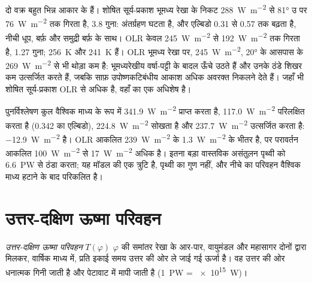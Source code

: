 दो वक्र बहुत भिन्न आकार के हैं। शोषित सूर्य-प्रकाश भूमध्य रेखा के निकट \qty{288}{W.m^{-2}} से \ang{81} उ पर \qty{76}{W.m^{-2}} तक गिरता है, \num{3.8} गुना: अंतर्ग्रहण घटता है, और एल्बिडो \num{0.31} से \num{0.57} तक बढ़ता है, नीची धूप, बर्फ़ और समुद्री बर्फ़ के साथ। OLR केवल \qty{245}{W.m^{-2}} से \qty{192}{W.m^{-2}} तक गिरता है, \num{1.27} गुना;  \qty{256}{K} और \qty{241}{K} हैं। OLR भूमध्य रेखा पर, \qty{245}{W.m^{-2}}, \ang{20} के आसपास के \qty{269}{W.m^{-2}} से भी थोड़ा कम है: भूमध्यरेखीय वर्षा-पट्टी के बादल ऊँचे उठते हैं और उनके ठंडे शिखर कम उत्सर्जित करते हैं, जबकि साफ़ उपोष्णकटिबंधीय आकाश अधिक अवरक्त निकलने देते हैं। जहाँ भी शोषित सूर्य-प्रकाश OLR से अधिक है, वहाँ  का एक अधिशेष है।

\begin{example}[पुनर्विश्लेषण का वैश्विक बजट]\label{ex:b1:radiation-heat-transport:global}
पुनर्विश्लेषण कुल वैश्विक माध्य के रूप में \qty{341.9}{W.m^{-2}} प्राप्त करता है, \qty{117.0}{W.m^{-2}} परिलक्षित करता है (\num{0.342} का एल्बिडो), \qty{224.8}{W.m^{-2}} सोखता है और \qty{237.7}{W.m^{-2}} उत्सर्जित करता है:  \qty{-12.9}{W.m^{-2}} है। OLR आकलित \qty{239}{W.m^{-2}} के \qty{1.3}{W.m^{-2}} के भीतर है, पर परावर्तन आकलित \qty{100}{W.m^{-2}} से \qty{17}{W.m^{-2}} अधिक है। इतना बड़ा वास्तविक असंतुलन पृथ्वी को \qty{6.6}{PW} से ठंडा करता; यह मॉडल की एक त्रुटि है, पृथ्वी का गुण नहीं, और नीचे का परिवहन वैश्विक माध्य हटाने के बाद परिकलित है।
\end{example}

\section{उत्तर-दक्षिण ऊष्मा परिवहन}\label{sec:b1:radiation-heat-transport:transport}

\begin{definition}[उत्तर-दक्षिण ऊष्मा परिवहन]\label{def:b1:radiation-heat-transport:mht}
\emph{उत्तर-दक्षिण ऊष्मा परिवहन} $T(\varphi)$  $\varphi$ की समांतर रेखा के आर-पार, वायुमंडल और महासागर दोनों द्वारा मिलकर, वार्षिक माध्य में, प्रति इकाई समय उत्तर की ओर ले जाई गई ऊर्जा है। वह उत्तर की ओर धनात्मक गिनी जाती है और पेटावाट में मापी जाती है (\qty{1}{PW} = \qty{e15}{W})।
\end{definition}

